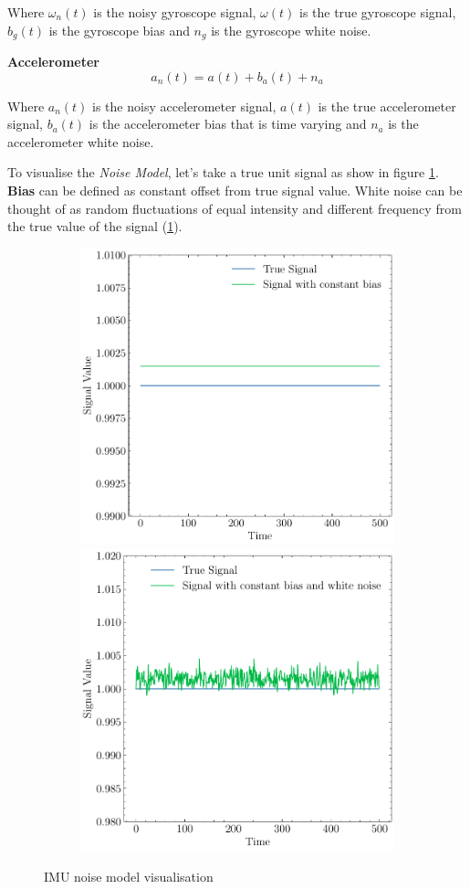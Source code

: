 Where $ \omega_{n}(t) $ is the noisy gyroscope signal, $ \omega(t) $ is the true gyroscope signal, $ b_{g}(t) $ is the gyroscope bias and $ n_{g} $ is the gyroscope white noise.

\textbf{Accelerometer}
\begin{equation}
    a_{n}(t) = a(t) + b_{a}(t) + n_{a}
\label{eqn:accel_noise}
\end{equation}

Where $ a_{n}(t) $ is the noisy accelerometer signal, $ a(t) $ is the true accelerometer signal, $ b_{a}(t) $ is the accelerometer bias that is time varying and $ n_{a} $ is the accelerometer white noise.

To visualise the \textit{Noise Model}, let's take a true unit signal as show in figure \ref{fig:imu_noise}. \textbf{Bias} can be defined as constant offset from true signal value. White noise can be thought of as random fluctuations of equal intensity and different frequency from the true value of the signal (\ref{fig:imu_noise}).

\begin{figure}[H]
  \begin{subfigure}{\linewidth}
  \includegraphics[width=.5\linewidth]{images/fig_chapter2/noise_figs/signal_with_bias.pdf}\hfill
  \includegraphics[width=.5\linewidth]{images/fig_chapter2/noise_figs/signal_with_bias_and_noise.pdf}
  \end{subfigure}\par\medskip
  \caption{IMU noise model visualisation}
\label{fig:imu_noise}
\end{figure}

